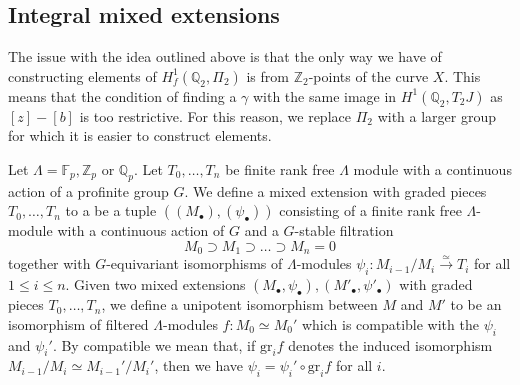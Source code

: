 \documentclass[11pt]{amsart}
\def\Z{\mathbb Z}
\def\Q{\mathbb Q}
\def\F{\mathbb F}
\theoremstyle{plain}
\theoremstyle{definition}
\DeclareMathOperator{\rk}{rk}
\newcommand{\Ker}{\mathrm{Ker}}
\newcommand{\gr}{\mathrm{gr}}
\begin{document}
\subsection{Integral mixed extensions}
The issue with the idea outlined above is that the only way we have of constructing elements of $H^1 _{f} (\Q _2 ,\Pi _2 )$ is from $\Z _2 $-points of the curve $X$. This means that the condition of finding a $\gamma $ with the same image in $H^1 (\Q _2 ,T_2 J)$ as $[z]-[b]$ is too restrictive. For this reason, we replace $\Pi  _2 $ with a larger group for which it is easier to construct elements. 

Let $\Lambda =\F _p ,\Z _p $ or $\Q _p $.
Let $T_0 ,\ldots ,T_n $ be finite rank free $\Lambda $ module with a continuous action of a profinite group $G$. We define a mixed extension with graded pieces $T_0 ,\ldots ,T_n $ to a be a tuple $((M_\bullet ), (\psi _\bullet ))$ consisting of a finite rank free $\Lambda $-module with a continuous action of $G$ and a $G$-stable filtration
\[
M_0 \supset M_1 \supset \ldots \supset M_n = 0
\]
together with $G$-equivariant isomorphisms of $\Lambda $-modules $\psi _i :M_{i-1}/M_i \stackrel{\simeq }{\longrightarrow }T_i$ for all $1\leq i\leq n$. Given two mixed extensions $(M_\bullet ,\psi _\bullet ),(M' _\bullet ,\psi ' _\bullet )$ with graded pieces $T_0 ,\ldots ,T_n $, we define a unipotent isomorphism between $M$ and $M'$ to be an isomorphism of filtered $\Lambda $-modules $f:M_0 \simeq M_0 '$ which is compatible with the $\psi _i $ and $\psi _i '$. By compatible we mean that, if $\gr _i f$ denotes the induced isomorphism $M_{i-1}/M_i \simeq M_{i-1}' /M_i '$, then we have $\psi _i =\psi _i ' \circ \gr _i f$ for all $i$.
\end{document}
